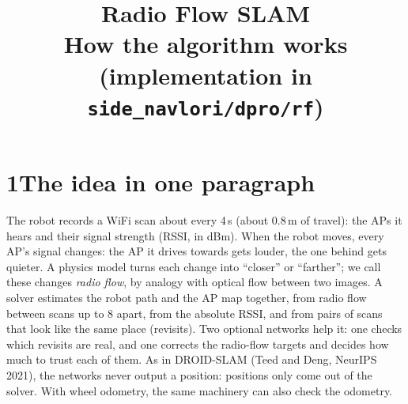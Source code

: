 \documentclass[11pt]{article}
\title{Radio Flow SLAM\\[2pt]\large How the algorithm works (implementation in \texttt{side\_navlori/dpro/rf})}
\author{}
\date{}
\newcommand{\x}{\mathbf{x}}
\begin{document}
\maketitle

\section*{1\quad The idea in one paragraph}
The robot records a WiFi scan about every 4\,s (about 0.8\,m of travel): the APs it hears and their signal
strength (RSSI, in dBm). When the robot moves, every AP's signal changes: the AP it drives towards gets
louder, the one behind gets quieter. A physics model turns each change into ``closer'' or ``farther''; we
call these changes \emph{radio flow}, by analogy with optical flow between two images. A solver estimates
the robot path and the AP map together, from radio flow between scans up to 8 apart, from the absolute
RSSI, and from pairs of scans that look like the same place (revisits). Two optional networks help it: one
checks which revisits are real, and one corrects the radio-flow targets and decides how much to trust each
of them. As in DROID-SLAM (Teed and Deng, NeurIPS 2021), the networks never output a position: positions
only come out of the solver. With wheel odometry, the same machinery can also check the odometry.

\begin{center}
\end{center}
\end{document}
